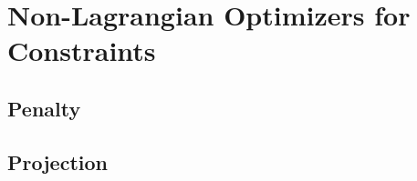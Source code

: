 \section{Non-Lagrangian Optimizers for Constraints} 

\subsection{Penalty} 

\subsection{Projection} 
